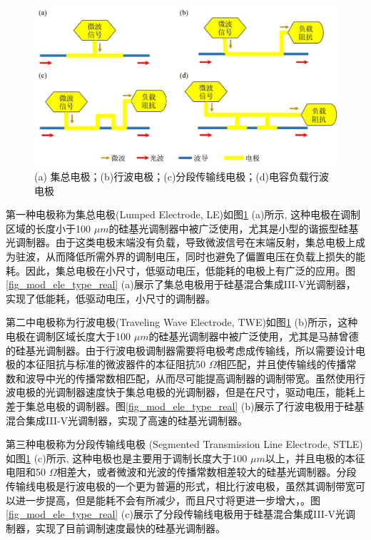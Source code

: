 \begin{figure}[htb]
	\centering
	\includegraphics[width=12cm]{./Pictures/fig_mod_ele_type.jpg}
	\caption{ (a) 集总电极；(b)行波电极；(c)分段传输线电极；(d)电容负载行波电极}
	\label{fig_mod_ele_type}
\end{figure}

第一种电极称为集总电极(Lumped Electrode, LE)如图\ref{fig_mod_ele_type} (a)所示, 这种电极在调制区域的长度小于100 $\mu m$的硅基光调制器中被广泛使用，尤其是小型的谐振型硅基光调制器。由于这类电极末端没有负载，导致微波信号在末端反射，集总电极上成为驻波，从而降低所需外界的调制电压，同时也避免了偏置电压在负载上损失的能耗。因此，集总电极在小尺寸，低驱动电压，低能耗的电极上有广泛的应用。图\ref{fig_mod_ele_type_real} (a)展示了集总电极用于硅基混合集成III-V光调制器\cite{tang2012energy}，实现了低能耗，低驱动电压，小尺寸的调制器。

第二中电极称为行波电极(Traveling Wave Electrode, TWE)如图\ref{fig_mod_ele_type} (b)所示，这种电极在调制区域长度大于100 $\mu m$的硅基光调制器中被广泛使用，尤其是马赫曾德的硅基光调制器。由于行波电极调制器需要将电极考虑成传输线，所以需要设计电极的本征阻抗与标准的微波器件的本征阻抗50 $\Omega$相匹配，并且使传输线的传播常数和波导中光的传播常数相匹配，从而尽可能提高调制器的调制带宽。虽然使用行波电极的光调制器速度快于集总电极的光调制器，但是在尺寸，驱动电压，能耗上差于集总电极的调制器。图\ref{fig_mod_ele_type_real} (b)展示了行波电极用于硅基混合集成III-V光调制器\cite{tang2012energy}，实现了高速的硅基光调制器。

第三种电极称为分段传输线电极 (Segmented Transmission Line Electrode, STLE) 如图\ref{fig_mod_ele_type} (c)所示, 这种电极也是主要用于调制长度大于100 $\mu m$以上，并且电极的本征电阻和50 $\Omega$相差大，或者微波和光波的传播常数相差较大的硅基光调制器。分段传输线电极是行波电极的一个更为普遍的形式，相比行波电极，虽然其调制带宽可以进一步提高，但是能耗不会有所减少，而且尺寸将更进一步增大，。图\ref{fig_mod_ele_type_real} (c)展示了分段传输线电极用于硅基混合集成III-V光调制器\cite{tang2012energy}，实现了目前调制速度最快的硅基光调制器。

